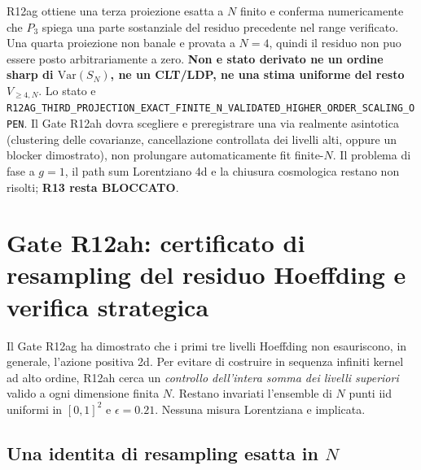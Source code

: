 \documentclass[11pt,a4paper]{article}
\begin{document}
R12ag ottiene una terza proiezione esatta a $N$ finito e conferma numericamente che $P_3$ spiega una parte sostanziale del residuo precedente nel range verificato. Una quarta proiezione non banale e provata a $N=4$, quindi il residuo non puo essere posto arbitrariamente a zero. \textbf{Non e stato derivato ne un ordine sharp di $\mathrm{Var}(S_N)$, ne un CLT/LDP, ne una stima uniforme del resto $V_{\ge4,N}$}. Lo stato e \nolinkurl{R12AG_THIRD_PROJECTION_EXACT_FINITE_N_VALIDATED_HIGHER_ORDER_SCALING_OPEN}. Il Gate R12ah dovra scegliere e preregistrare una via realmente asintotica (clustering delle covarianze, cancellazione controllata dei livelli alti, oppure un blocker dimostrato), non prolungare automaticamente fit finite-$N$. Il problema di fase a $g=1$, il path sum Lorentziano 4d e la chiusura cosmologica restano non risolti; \textbf{R13 resta BLOCCATO}.

\section{Gate R12ah: certificato di resampling del residuo Hoeffding e verifica strategica}
\label{sec:r12ah}

Il Gate R12ag ha dimostrato che i primi tre livelli Hoeffding non esauriscono, in generale, l'azione positiva 2d. Per evitare di costruire in sequenza infiniti kernel ad alto ordine, R12ah cerca un \emph{controllo dell'intera somma dei livelli superiori} valido a ogni dimensione finita $N$. Restano invariati l'ensemble di $N$ punti iid uniformi in $[0,1]^2$ e $\epsilon=0.21$. Nessuna misura Lorentziana e implicata.

\subsection{Una identita di resampling esatta in $N$}
\end{document}
